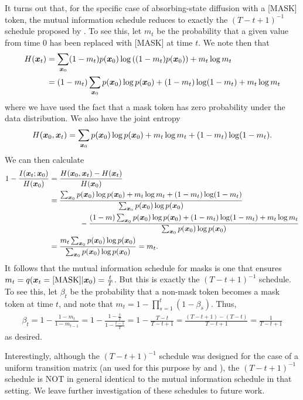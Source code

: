 It turns out that, for the specific case of absorbing-state diffusion with a [MASK] token, the mutual information schedule reduces to exactly the $(T-t+1)^{-1}$ schedule proposed by \citet{sohl2015deep}. To see this, let $m_t$ be the probability that a given value from time 0 has been replaced with [MASK] at time $t$. We note then that
\begin{align*}
H(\boldsymbol{x}_t) &= \sum_{\boldsymbol{x}_0} (1 - m_t) p(\boldsymbol{x}_0) \log \left((1 - m_t) p(\boldsymbol{x}_0) \right) + m_t \log m_t
\\&= (1 - m_t) \sum_{\boldsymbol{x}_0}p(\boldsymbol{x}_0) \log  p(\boldsymbol{x}_0) + (1 - m_t)\log(1 - m_t) + m_t \log m_t
\end{align*}
where we have used the fact that a mask token has zero probability under the data distribution. We also have the joint entropy
\begin{align*}
H(\boldsymbol{x}_0, \boldsymbol{x}_t) = \sum_{\boldsymbol{x}_0} p(\boldsymbol{x}_0) \log p(\boldsymbol{x}_0) + m_t \log m_t + (1-m_t)\log(1-m_t).
\end{align*}
We can then calculate
\begin{align*}
1 - \frac{I(\boldsymbol{x}_t; \boldsymbol{x}_0)}{H(\boldsymbol{x}_0)}
&= \frac{H(\boldsymbol{x}_0, \boldsymbol{x}_t) - H(\boldsymbol{x}_t)}{H(\boldsymbol{x}_0)}
\\&=  \frac{ \sum_{\boldsymbol{x}_0} p(\boldsymbol{x}_0) \log p(\boldsymbol{x}_0) + m_t \log m_t + (1-m_t)\log(1-m_t)}{\sum_{\boldsymbol{x}_0} p(\boldsymbol{x}_0) \log p(\boldsymbol{x}_0)}
\\&\qquad\qquad- \frac{(1 - m) \sum_{\boldsymbol{x}_0}p(\boldsymbol{x}_0) \log  p(\boldsymbol{x}_0) + (1 - m_t)\log(1 - m_t) + m_t \log m_t}{\sum_{\boldsymbol{x}_0} p(\boldsymbol{x}_0) \log p(\boldsymbol{x}_0)}
\\&= \frac{m_t\sum_{\boldsymbol{x}_0} p(\boldsymbol{x}_0) \log p(\boldsymbol{x}_0)}{\sum_{\boldsymbol{x}_0} p(\boldsymbol{x}_0) \log p(\boldsymbol{x}_0)}
= m_t.
\end{align*}
It follows that the mutual information schedule for masks is one that ensures $m_t = q(\boldsymbol{x}_t = 
\text{[MASK]} | \boldsymbol{x}_0) = \frac{t}{T}$. But this is exactly the $(T-t+1)^{-1}$ schedule. To see this, let $\beta_t$ be the probability that a non-mask token becomes a mask token at time $t$, and note that $m_t = 1 - \prod_{s=1}^t (1 - \beta_s)$. Thus,
\begin{align*}
\beta_t = 1 - \frac{1 - m_t}{1 - m_{t-1}}
= 1 - \frac{1 - \frac{t}{T}}{1 - \frac{t-1}{T}}
= 1 - \frac{T - t}{T - t + 1}
= \frac{(T - t + 1) - (T - t)}{T - t + 1}
= \frac{1}{T - t + 1}
\end{align*}
as desired.

Interestingly, although the $(T-t+1)^{-1}$ schedule was designed for the case of a uniform transition matrix (an used for this purpose by \citet{sohl2015deep} and \citet{hoogeboom2021argmax}), the $(T-t+1)^{-1}$ schedule is NOT in general identical to the mutual information schedule in that setting. We leave further investigation of these schedules to future work.

